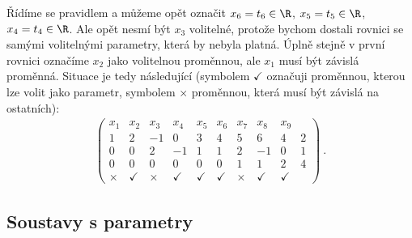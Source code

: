 \begin{example}
    Řídíme se pravidlem a můžeme opět označit $x_6 = t_6 \in \R$, $x_5 = t_5 \in \R$, $x_4 = t_4 \in \R$. Ale opět nesmí být $x_3$ volitelné, protože bychom dostali rovnici se samými volitelnými parametry, která by nebyla platná.
    Úplně stejně v první rovnici označíme $x_2$ jako volitelnou proměnnou, ale $x_1$ musí být závislá proměnná. Situace je tedy následující (symbolem $\checkmark$ označuji proměnnou, kterou lze volit jako parametr, symbolem $\times$ proměnnou, která musí být závislá na ostatních):
    \begin{align}
        \left(\begin{array}{rrrrrrrrr|r}
            x_1 & x_2 & x_3 & x_4 & x_5 & x_6 & x_7 & x_8 & x_9 \\ \hline
            1 & 2 & -1 & 0 & 3 & 4 & 5 & 6 & 4 & 2 \\
            0 & 0 & 2  & -1 & 1 & 1 & 2 & -1 & 0 & 1 \\
            0 & 0 & 0  & 0 & 0 & 0 & 1 & 1 & 2 & 4 \\ \hline
            \times & \checkmark & \times & \checkmark & \checkmark & \checkmark & \times & \checkmark & \checkmark
        \end{array}\right) \:.
    \end{align}
\end{example}

\subsection*{Soustavy s parametry}


